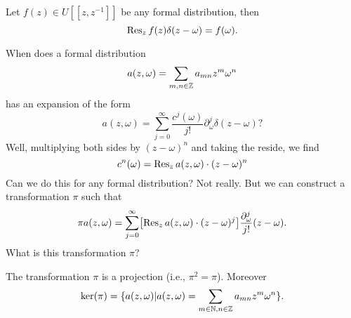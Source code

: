 \label{prop:integrateDeltaFn}
Let $f(z)\in U[[z,z^{-1}]]$ be any formal distribution, then
\begin{equation}
\Res[z]{f(z)\delta(z-\omega)}=f(\omega).
\end{equation}


\M
When does a formal distribution
\begin{equation}
a(z,\omega)=\sum_{m,n\in\ZZ}a_{mn}z^{m}\omega^{n}
\end{equation}
has an expansion of the form
\begin{equation}
a(z,\omega)=\sum^{\infty}_{j=0}\frac{c^{j}(\omega)}{j!}\partial^{j}_{\omega}\delta(z-\omega)?
\end{equation}
Well, multiplying both sides by $(z-\omega)^{n}$ and taking the reside,
we find
\begin{equation}
c^{n}(\omega)=\Res[z]{a(z,\omega)\cdot(z-\omega)^{n}}
\end{equation}
Can we do this for any formal distribution? Not really. But we can
construct a transformation $\pi$ such that
\begin{equation}
\pi
a(z,\omega)=\sum^{\infty}_{j=0}\bigl[\Res[z]{a(z,\omega)\cdot(z-\omega)^{j}}\bigr]\frac{\partial^{j}_{\omega}}{j!}(z-\omega).
\end{equation}
What is this transformation $\pi$?

\begin{prop}
The transformation $\pi$ is a projection (i.e., $\pi^{2}=\pi$). Moreover
\begin{equation}
\ker(\pi)=\{a(z,\omega)| a(z,\omega)=\sum_{m\in\NN,n\in\ZZ}a_{mn}z^{m}\omega^{n}\}.
\end{equation}
\end{prop}

